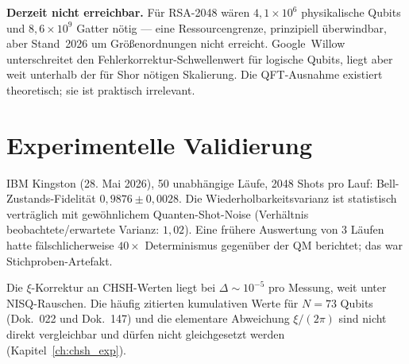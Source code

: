 \textbf{Derzeit nicht erreichbar.}
Für RSA-2048 wären $4{,}1\times10^6$ physikalische Qubits und
$8{,}6\times10^9$ Gatter nötig --- eine Ressourcengrenze,
prinzipiell überwindbar, aber Stand~2026 um Größenordnungen
nicht erreicht. Google~Willow unterschreitet den
Fehlerkorrektur-Schwellenwert für logische Qubits, liegt aber
weit unterhalb der für Shor nötigen Skalierung. Die QFT-Ausnahme
existiert theoretisch; sie ist praktisch irrelevant.

\section{Experimentelle Validierung}

IBM Kingston (28. Mai 2026), 50 unabhängige Läufe, 2048 Shots pro Lauf:
Bell-Zustands-Fidelität $0{,}9876\pm0{,}0028$. Die Wiederholbarkeitsvarianz
ist statistisch verträglich mit gewöhnlichem Quanten-Shot-Noise (Verhältnis
beobachtete/erwartete Varianz: $1{,}02$). Eine frühere Auswertung von 3
Läufen hatte fälschlicherweise $40\times$ Determinismus gegenüber der QM
berichtet; das war Stichproben-Artefakt.

Die $\xi$-Korrektur an CHSH-Werten liegt bei $\Delta\sim10^{-5}$ pro
Messung, weit unter NISQ-Rauschen. Die häufig zitierten kumulativen
Werte für $N = 73$ Qubits (Dok.~022 und Dok.~147) und die elementare
Abweichung $\xi/(2\pi)$ sind nicht direkt vergleichbar und dürfen nicht
gleichgesetzt werden (Kapitel~\ref{ch:chsh_exp}).

